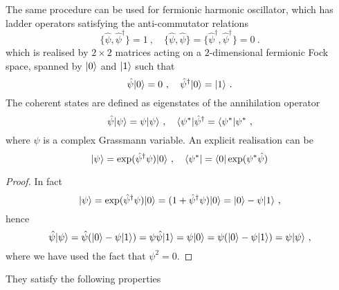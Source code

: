     The same procedure can be used for fermionic harmonic oscillator, which has ladder operators satisfying the anti-commutator relations
    \begin{equation*}
        \{\hat \psi, \hat \psi^\dagger \} = 1 ~, \quad \{\hat \psi, \hat \psi\} = \{\hat \psi^\dagger, \hat \psi^\dagger\} = 0 ~.
    \end{equation*}
    which is realised by $2 \times 2$ matrices acting on a $2$-dimensional fermionic Fock space, spanned by $\vert0\rangle$ and $\vert1\rangle$ such that 
    \begin{equation*}
        \hat \psi \vert0\rangle = 0 ~, \quad \hat \psi^\dagger \vert0\rangle = \vert1\rangle ~.
    \end{equation*}
    The coherent states are defined as eigenstates of the annihilation operator 
    \begin{equation*}
        \hat \psi \vert\psi\rangle = \psi \vert\psi\rangle ~, \quad \langle\psi^*\vert \hat \psi^\dagger = \langle\psi^*\vert \psi^* ~,
    \end{equation*}
    where $\psi$ is a complex Grassmann variable. An explicit realisation can be 
    \begin{equation*}
        \vert\psi\rangle = \exp(\hat \psi^\dagger \psi) \vert0\rangle ~, \quad \langle\psi^*\vert = \langle0\vert \exp(\psi^* \hat \psi)
    \end{equation*}
    \begin{proof}
        In fact 
        \begin{equation*}
            \vert\psi\rangle = \exp(\hat \psi^\dagger \psi) \vert0\rangle = (1 + \hat \psi^\dagger \psi) \vert0\rangle = \vert0\rangle - \psi \vert1\rangle ~,
        \end{equation*}
        hence 
        \begin{equation*}
            \hat \psi \vert\psi\rangle = \hat \psi (\vert0\rangle - \psi \vert1\rangle) = \psi \hat \psi \vert1\rangle = \psi \vert0\rangle = \psi (\vert0\rangle - \psi \vert1\rangle) = \psi \vert\psi\rangle ~,
        \end{equation*}
        where we have used the fact that $\psi^2 = 0$.
    \end{proof}
    They satisfy the following properties

